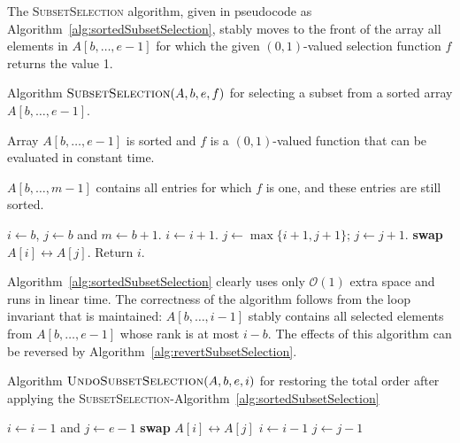 \documentclass{elsart}
\newcommand{\Oh}[1]{\ensuremath{\mathcal{O}(#1)}}
\begin{document}
The \textsc{SubsetSelection} algorithm, given in pseudocode as
Algorithm~\ref{alg:sortedSubsetSelection}, stably moves to the front
of the array all elements in $A[b,\ldots, e-1]$ for which the given
$(0,1)$-valued selection function $f$ returns the value 1.

\begin{algorithm}
  \caption{Algorithm
    $\textsc{SubsetSelection}(A,b,e,f)$ for selecting a
    subset from a sorted array $A[b,\ldots, e-1]$.} 
  \label{alg:sortedSubsetSelection}\label{alg:subsetselection}
  \begin{algorithmic}[1]
    \REQUIRE Array $A[b,\ldots, e-1]$ is sorted and $f$ is a 
    $(0,1)$-valued function that can be evaluated in constant
    time.
    
    \ENSURE $A[b,\ldots, m-1]$ contains all entries for which
    $f$ is one, and these entries are still sorted.

    \STATE $i\gets b$, $j\gets b$ and $m\gets b+1$. 
        \STATE $i\gets i+1$.  
      \ENDWHILE
      \STATE $j\gets \max\{i+1,j+1\}$;
        \STATE $j\gets j+1$.  
      \ENDWHILE
        \STATE \textbf{swap} $A[i]\leftrightarrow A[j]$.
      \ENDIF
    \ENDWHILE
    \STATE Return $i$.
  \end{algorithmic}
\end{algorithm}

Algorithm~\ref{alg:sortedSubsetSelection} clearly uses only \Oh{1}
extra space and runs in linear time. The correctness of the algorithm
follows from the loop invariant that is maintained: $A[b,\ldots, i-1]$
stably contains all selected elements from $A[b,\ldots, e-1]$ whose rank
is at most $i-b$.  The effects of this algorithm can be reversed by
Algorithm~\ref{alg:revertSubsetSelection}.

\begin{algorithm}
  \caption{Algorithm $\textsc{UndoSubsetSelection}(A,b,e,i)$
    for restoring the total order after applying the 
    \textsc{SubsetSelection}-Algorithm~\ref{alg:sortedSubsetSelection}}
  \label{alg:revertSubsetSelection}\label{alg:undosubsetselection}
  \begin{algorithmic}[1]

    
    \STATE $i\gets i-1$ and $j\gets e-1$
        \STATE \textbf{swap} $A[i]\leftrightarrow A[j]$
        \STATE $i\gets i-1$
      \ENDIF
        \STATE $j\gets j-1$
    \ENDWHILE

  \end{algorithmic}
\end{algorithm}
\end{document}
